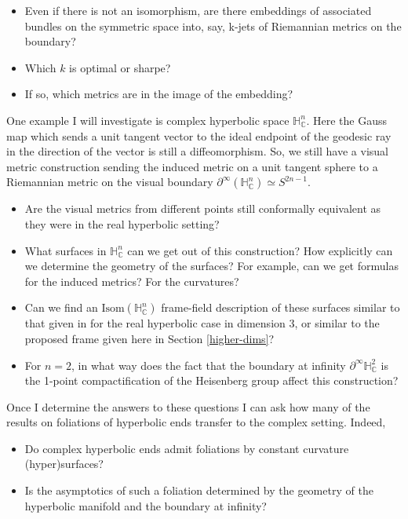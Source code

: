 \documentclass[11pt]{amsart}
\newcommand{\C}{\mathbb{C}}
\renewcommand{\H}{\mathbb{H}}
\begin{document}
\begin{itemize}

\item Even if there is not an isomorphism, are there embeddings of associated bundles on the symmetric space into, say, k-jets of Riemannian metrics on the boundary?

\item Which $k$ is optimal or sharpe?

\item If so, which metrics are in the image of the embedding?

\end{itemize}

One example I will investigate is complex hyperbolic space $\H_{\C}^n$.
Here the Gauss map which sends a unit tangent vector to the ideal endpoint of the geodesic ray in the direction of the vector is still a diffeomorphism. So, we still have a visual metric construction sending the induced metric on a unit tangent sphere to a Riemannian metric on the visual boundary $\partial^\infty (\H_{\C}^n) \simeq S^{2n-1}$. 

\begin{itemize}

\item Are the visual metrics from different points still conformally equivalent as they were in the real hyperbolic setting?

\item What surfaces in $\H_{\C}^n$ can we get out of this construction? How explicitly can we determine the geometry of the surfaces? For example, can we get formulas for the induced metrics? For the curvatures?

\item Can we find an $\mathrm{Isom}(\H_{\C}^n)$ frame-field description of these surfaces similar to that given in \cite{dumas2017} for the real hyperbolic case in dimension 3, or similar to the proposed frame given here in Section \ref{higher-dims}?

\item For $n=2$, in what way does the fact that the boundary at infinity $\partial^\infty \H_{\C}^2$ is the 1-point compactification of the Heisenberg group affect this construction?

\end{itemize}
Once I determine the answers to these questions I can ask how many of the results on foliations of hyperbolic ends transfer to the complex setting. Indeed,
\begin{itemize}

\item Do complex hyperbolic ends admit foliations by constant curvature (hyper)surfaces?

\item Is the asymptotics of such a foliation determined by the geometry of the hyperbolic manifold and the boundary at infinity?

\end{itemize}






\end{document}
